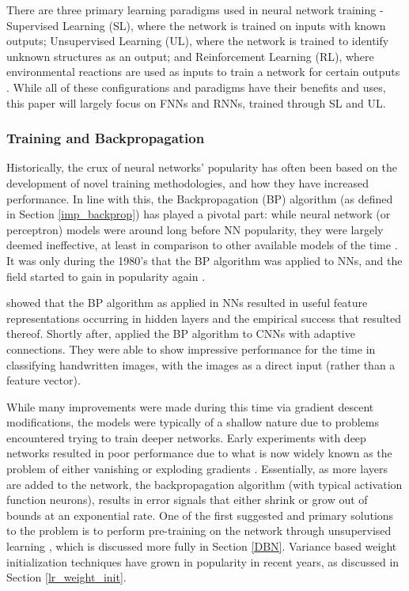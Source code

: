 \documentclass[a4paper,11pt,oneside]{article}
\theoremstyle{plain}
\theoremstyle{definition}
\begin{document}
	There are three primary learning paradigms used in neural network training - Supervised Learning (SL), 
	where the network is trained on inputs with known outputs; Unsupervised Learning (UL), where the network is 
	trained to identify unknown structures as an output; and Reinforcement Learning (RL), where environmental
	reactions are used as inputs to train a network for certain outputs \citep{Schmidhuber}. While all of these configurations and paradigms 
	have their benefits and uses, this paper will largely focus on FNNs and RNNs, trained through SL and UL.
	\hfill \break 
	
	\subsubsection{Training and Backpropagation}\label{lr_trainingbackprop}
	
	Historically, the crux of neural networks’ popularity has often been based on the development of novel training 
	methodologies, and how they have increased performance. In line with this, the Backpropagation (BP) algorithm (as defined in Section \ref{imp_backprop})
	has played a pivotal part: while neural network (or perceptron) models were around long before NN popularity, 
	they were largely deemed ineffective, at least in comparison to other available models of the time 
	\citep{Minksy}. It was only during the 1980’s that the BP algorithm was applied to NNs, and 
	the field started to gain in popularity again \citep{LeCun2, Werbos2}. 
	\hfill \break 
	
	\citet{Rumelhart} showed that the BP algorithm as applied in NNs resulted in useful feature representations 
	occurring in hidden layers and the empirical success that resulted thereof.  
	Shortly after, \citet{LeCun3} applied the BP algorithm to CNNs with adaptive connections. They were able to show 
	impressive performance for the time in classifying handwritten images, with the images as a direct input (rather than a feature vector).
	\hfill \break 
	
	While many improvements were made during this time via gradient descent modifications, the 
	models were typically of a shallow nature due to problems encountered trying to train deeper networks. 
	Early experiments with deep networks resulted in poor performance due to what is now widely known as the problem 
	of either vanishing or exploding gradients \citep{Pascanu}. Essentially, as more layers are added to the network, the backpropagation 
	algorithm (with typical activation function neurons), results in error signals that either shrink or grow out of bounds at an 
	exponential rate. One of the first suggested and primary solutions to the problem is to perform pre-training on the 
	network through unsupervised learning  \citep{Schmidhuber}, which is discussed more fully in Section \ref{DBN}. Variance based 
	weight initialization techniques have grown in popularity in recent years, as discussed in Section \ref{lr_weight_init}.
	\hfill \break 
	
\end{document}
